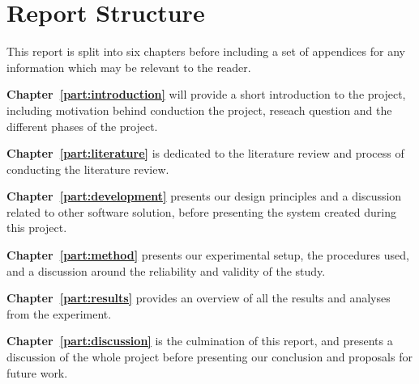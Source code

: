 \section{Report Structure}
This report is split into six chapters before including a set of appendices for any information which may be relevant to the reader.

\bigskip\noindent
\textbf{Chapter~\ref{part:introduction}} will provide a short introduction to the project, including motivation behind conduction the project, reseach question and the different phases of the project.

\bigskip\noindent
\textbf{Chapter~\ref{part:literature}} is dedicated to the literature review and process of conducting the literature review. 

\bigskip\noindent
\textbf{Chapter~\ref{part:development}} presents our design principles and a discussion related to other software solution, before presenting the system created during this project. 

\bigskip\noindent
\textbf{Chapter~\ref{part:method}} presents our experimental setup, the procedures used, and a discussion around the reliability and validity of the study.

\bigskip\noindent
\textbf{Chapter~\ref{part:results}} provides an overview of all the results and analyses from the experiment.

\bigskip\noindent
\textbf{Chapter~\ref{part:discussion}} is the culmination of this report, and presents a discussion of the whole project before presenting our conclusion and proposals for future work. 


